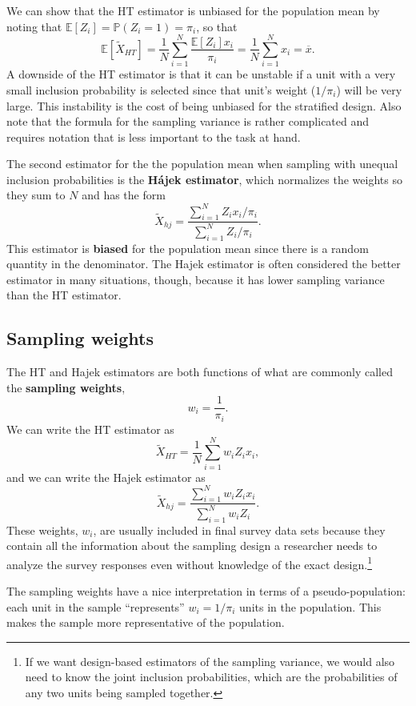 \documentclass[
  13pt,
  letterpaper,
  DIV=11,
  numbers=noendperiod]{scrreprt}
\newcommand{\E}{\mathbb{E}}
\renewcommand{\P}{\mathbb{P}}
\theoremstyle{plain}
\theoremstyle{plain}
\theoremstyle{definition}
\theoremstyle{definition}
\theoremstyle{remark}
\begin{document}
We can show that the HT estimator is unbiased for the population mean by
noting that \(\E[Z_i] = \P(Z_i = 1) = \pi_i\), so that \[
\E[\widetilde{X}_{HT}] = \frac{1}{N} \sum_{i=1}^N \frac{\E[Z_i]x_i}{\pi_i} = \frac{1}{N} \sum_{i=1}^N x_i = \overline{x}. 
\] A downside of the HT estimator is that it can be unstable if a unit
with a very small inclusion probability is selected since that unit's
weight (\(1/\pi_i\)) will be very large. This instability is the cost of
being unbiased for the stratified design. Also note that the formula for
the sampling variance is rather complicated and requires notation that
is less important to the task at hand.

The second estimator for the the population mean when sampling with
unequal inclusion probabilities is the \textbf{Hájek estimator}, which
normalizes the weights so they sum to \(N\) and has the form \[ 
\widetilde{X}_{hj} = \frac{\sum_{i=1}^N Z_{i}x_{i} / \pi_{i}}{\sum_{i=1}^{N} Z_{i}/\pi_{i}}.
\] This estimator is \textbf{biased} for the population mean since there
is a random quantity in the denominator. The Hajek estimator is often
considered the better estimator in many situations, though, because it
has lower sampling variance than the HT estimator.

\subsection{Sampling weights}\label{sampling-weights}

The HT and Hajek estimators are both functions of what are commonly
called the \textbf{sampling weights}, \[
w_i = \frac{1}{\pi_i}.
\] We can write the HT estimator as \[
\widetilde{X}_{HT} = \frac{1}{N} \sum_{i=1}^N w_iZ_ix_i,
\] and we can write the Hajek estimator as \[
\widetilde{X}_{hj} = \frac{\sum_{i=1}^N w_iZ_{i}x_{i}}{\sum_{i=1}^{N} w_iZ_{i}}.
\] These weights, \(w_i\), are usually included in final survey data
sets because they contain all the information about the sampling design
a researcher needs to analyze the survey responses even without
knowledge of the exact design.\footnote{If we want design-based
  estimators of the sampling variance, we would also need to know the
  joint inclusion probabilities, which are the probabilities of any two
  units being sampled together.}

The sampling weights have a nice interpretation in terms of a
pseudo-population: each unit in the sample ``represents''
\(w_i = 1/\pi_i\) units in the population. This makes the sample more
representative of the population.
\end{document}
